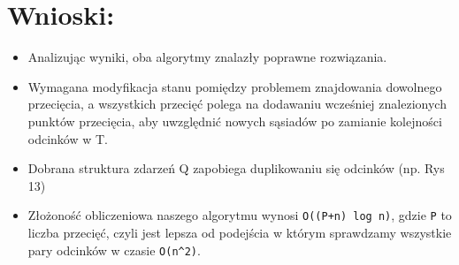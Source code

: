 \documentclass[12pt]{article}
\begin{document}
		\section*{Wnioski:}
		\begin{itemize}
			\item Analizując wyniki, oba algorytmy znalazły poprawne rozwiązania.
			\item Wymagana modyfikacja stanu pomiędzy problemem znajdowania dowolnego przecięcia, a wszystkich przecięć polega na dodawaniu wcześniej znalezionych punktów przecięcia, aby uwzględnić nowych sąsiadów po zamianie kolejności odcinków w T.
			\item Dobrana struktura zdarzeń Q zapobiega duplikowaniu się odcinków (np. Rys 13)
			\item Złożoność obliczeniowa naszego algorytmu wynosi \verb|O((P+n) log n)|, gdzie \verb|P| to liczba przecięć, czyli jest lepsza od podejścia w którym sprawdzamy wszystkie pary odcinków w czasie \verb|O(n^2)|.

		\end{itemize}
		
		
		
		
		
	
\end{document}

